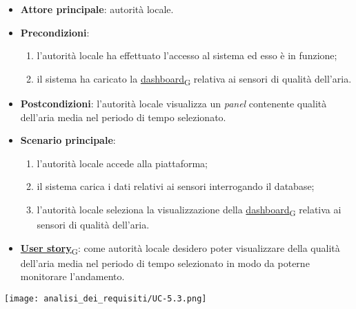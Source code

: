 \newpage

\begin{itemize}
	\item \textbf{Attore principale}: autorità locale.
	\item \textbf{Precondizioni}:
	      \begin{enumerate}
		      \item l'autorità locale ha effettuato l'accesso al sistema ed esso è in funzione;
		      \item il sistema ha caricato la \href{https://7last.github.io/docs/rtb/documentazione-interna/glossario\#dashboard}{dashboard\textsubscript{G}} relativa ai sensori di qualità dell'aria.
	      \end{enumerate}
	\item \textbf{Postcondizioni}: l'autorità locale visualizza un \textit{panel} contenente qualità dell'aria media nel periodo di tempo selezionato.
	\item \textbf{Scenario principale}:
	      \begin{enumerate}
		      \item l'autorità locale accede alla piattaforma;
		      \item il sistema carica i dati relativi ai sensori interrogando il database;
		      \item l'autorità locale seleziona la visualizzazione della \href{https://7last.github.io/docs/rtb/documentazione-interna/glossario\#dashboard}{dashboard\textsubscript{G}} relativa ai sensori di qualità dell'aria.
	      \end{enumerate}
	\item \href{https://7last.github.io/docs/rtb/documentazione-interna/glossario\#user-story}{\textbf{User story}\textsubscript{G}}: come autorità locale desidero poter visualizzare della qualità dell'aria media nel periodo di tempo selezionato
	      in modo da poterne monitorare l'andamento.
\end{itemize}
\begin{center}
	\texttt{[image: analisi\_dei\_requisiti/UC-5.3.png]}
\end{center}

\newpage

